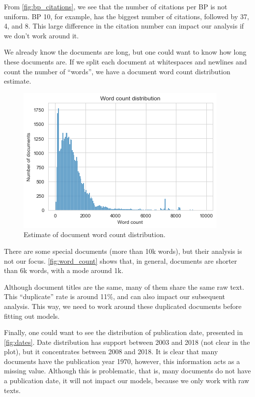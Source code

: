 \documentclass[twocolumn]{article}
\begin{document}
                  From \autoref{fig:bp_citations}, we see that the number of citations per BP is not uniform. BP 10, for example, has the biggest number of citations, followed by 37, 4, and 8. This large difference in the citation number can impact our analysis if we don't work around it.

                  We already know the documents are long, but one could want to know how long these documents are. If we split each document at whitespaces and newlines and count the number of ``words'', we have a document word count distribution estimate.

                  \begin{figure}[!h]
                        \includegraphics[width=\linewidth]{word_count.png}
                        \caption{Estimate of document word count distribution.}
                        \label{fig:word_count}
                  \end{figure}

                  There are some special documents (more than 10k words), but their analysis is not our focus. \autoref{fig:word_count} shows that, in general, documents are shorter than 6k words, with a mode around 1k.

                  Although document titles are the same, many of them share the same raw text. This ``duplicate'' rate is around 11\%, and can also impact our subsequent analysis. This way, we need to work around these duplicated documents before fitting out models.

                  Finally, one could want to see the distribution of publication date, presented in \autoref{fig:dates}. Date distribution has support between 2003 and 2018 (not clear in the plot), but it concentrates between 2008 and 2018. It is clear that many documents have the publication year 1970, however, this information acts as a missing value. Although this is problematic, that is, many documents do not have a publication date, it will not impact our models, because we only work with raw texts.
\end{document}
